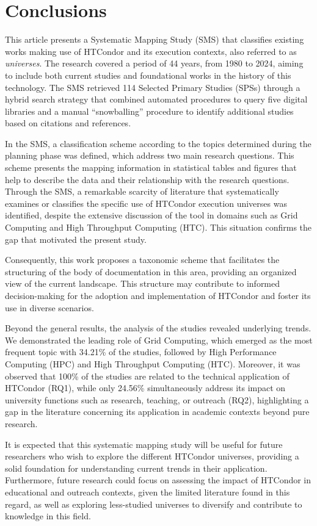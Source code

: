 \section{Conclusions}\label{sec:conclusiones}

This article presents a Systematic Mapping Study (SMS) that classifies existing works making use of HTCondor and its execution contexts, also referred to as \textit{universes}. The research covered a period of 44 years, from 1980 to 2024, aiming to include both current studies and foundational works in the history of this technology. The SMS retrieved 114 Selected Primary Studies (SPSs) through a hybrid search strategy that combined automated procedures to query five digital libraries and a manual “snowballing” procedure to identify additional studies based on citations and references.

In the SMS, a classification scheme according to the topics determined during the planning phase was defined, which address two main research questions. This scheme presents the mapping information in statistical tables and figures that help to describe the data and their relationship with the research questions. Through the SMS, a remarkable scarcity of literature that systematically examines or classifies the specific use of HTCondor execution universes was identified, despite the extensive discussion of the tool in domains such as Grid Computing and High Throughput Computing (HTC). This situation confirms the gap that motivated the present study.

Consequently, this work proposes a taxonomic scheme that facilitates the structuring of the body of documentation in this area, providing an organized view of the current landscape. This structure may contribute to informed decision-making for the adoption and implementation of HTCondor and foster its use in diverse scenarios.

Beyond the general results, the analysis of the studies revealed underlying trends. We demonstrated the leading role of Grid Computing, which emerged as the most frequent topic with 34.21\% of the studies, followed by High Performance Computing (HPC) and High Throughput Computing (HTC). Moreover, it was observed that 100\% of the studies are related to the technical application of HTCondor (RQ1), while only 24.56\% simultaneously address its impact on university functions such as research, teaching, or outreach (RQ2), highlighting a gap in the literature concerning its application in academic contexts beyond pure research.

It is expected that this systematic mapping study will be useful for future researchers who wish to explore the different HTCondor universes, providing a solid foundation for understanding current trends in their application. Furthermore, future research could focus on assessing the impact of HTCondor in educational and outreach contexts, given the limited literature found in this regard, as well as exploring less-studied universes to diversify and contribute to knowledge in this field.
